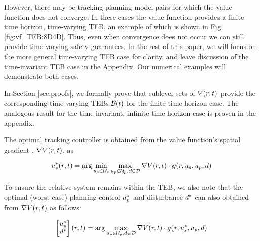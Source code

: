 However, there may be tracking-planning model pairs for which the value function does not converge.  
In these cases the value function provides a finite time horizon, time-varying TEB, an example of which is shown in Fig. \ref{fig:vf_TEB:8D4D}.
Thus, even when convergence does not occur we can still provide time-varying safety guarantees.
In the rest of this paper, we will focus on the more general time-varying TEB case for clarity, and leave discussion of the time-invariant TEB case in the Appendix.
Our numerical examples will demonstrate both cases.


In Section \ref{sec:proofs}, we formally prove that sublevel sets of $V(r,t)$ provide the corresponding time-varying TEBs $\mathcal B(t)$ for the finite time horizon case.
The analogous result for the time-invariant, infinite time horizon case is proven in the appendix.

The optimal tracking controller is obtained from the value function's spatial gradient \cite{Mitchell05, Fisac15, Chen2018}, $\nabla V(r, t)$, as

\begin{align} \label{eq:opt_ctrl_fin}
\tctrl^*(\rstate, \tvar) = \arg\min_{\tctrl\in\tcset} \max_{\pctrl\in\pcset, \dstb\in\dset} \nabla\valfunc(\rstate, \tvar) \cdot \rdyn(\rstate,\tctrl,\pctrl,\dstb)
\end{align}

To ensure the relative system remains within the TEB, we also note that the optimal (worst-case) planning control $u_p^*$ and disturbance $d^*$ can also obtained from $\nabla V(r, t)$ as follows:

\begin{align} \label{eq:opt_dstb_fin}
\begin{bmatrix}
  \pctrl^* \\
  \dstb^*
\end{bmatrix} (\rstate, \tvar) = \arg \max_{\pctrl\in\pcset, \dstb\in\dset} \nabla\valfunc(\rstate, \tvar) \cdot \rdyn(\rstate,\tctrl^*,\pctrl,\dstb)
\end{align}

